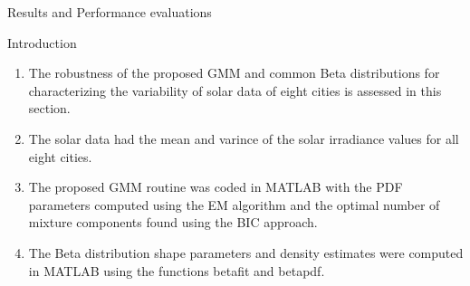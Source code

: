 \documentclass{beamer}
\begin{document}
\begin{frame}{Results and Performance evaluations }

\begin{block}{Introduction}
\begin{enumerate}
    \item The robustness of the proposed GMM and common Beta distributions for characterizing the variability of solar data of eight cities is assessed in this section.
    \item The solar data had the mean and varince of the solar irradiance values for all eight cities.
    \item  The proposed GMM routine was coded in MATLAB with the PDF parameters computed using the EM algorithm and the optimal number of mixture components found using the BIC approach.
    \item  The Beta distribution shape parameters and density estimates were computed in MATLAB using the functions betafit and betapdf. 
\end{enumerate}
\end{block}
\end{frame}
\end{document}
